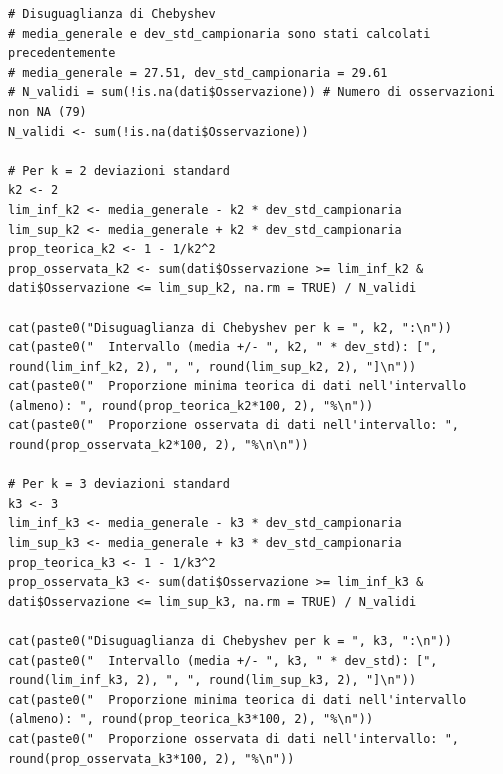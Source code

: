\documentclass[14pt, openany, titlepage]{report} %
\begin{document}
\begin{center}
\begin{lstlisting}[breaklines=true]
# Disuguaglianza di Chebyshev
# media_generale e dev_std_campionaria sono stati calcolati precedentemente
# media_generale = 27.51, dev_std_campionaria = 29.61
# N_validi = sum(!is.na(dati$Osservazione)) # Numero di osservazioni non NA (79)
N_validi <- sum(!is.na(dati$Osservazione))

# Per k = 2 deviazioni standard
k2 <- 2
lim_inf_k2 <- media_generale - k2 * dev_std_campionaria
lim_sup_k2 <- media_generale + k2 * dev_std_campionaria
prop_teorica_k2 <- 1 - 1/k2^2
prop_osservata_k2 <- sum(dati$Osservazione >= lim_inf_k2 & dati$Osservazione <= lim_sup_k2, na.rm = TRUE) / N_validi

cat(paste0("Disuguaglianza di Chebyshev per k = ", k2, ":\n"))
cat(paste0("  Intervallo (media +/- ", k2, " * dev_std): [", round(lim_inf_k2, 2), ", ", round(lim_sup_k2, 2), "]\n"))
cat(paste0("  Proporzione minima teorica di dati nell'intervallo (almeno): ", round(prop_teorica_k2*100, 2), "%\n"))
cat(paste0("  Proporzione osservata di dati nell'intervallo: ", round(prop_osservata_k2*100, 2), "%\n\n"))

# Per k = 3 deviazioni standard
k3 <- 3
lim_inf_k3 <- media_generale - k3 * dev_std_campionaria
lim_sup_k3 <- media_generale + k3 * dev_std_campionaria
prop_teorica_k3 <- 1 - 1/k3^2
prop_osservata_k3 <- sum(dati$Osservazione >= lim_inf_k3 & dati$Osservazione <= lim_sup_k3, na.rm = TRUE) / N_validi

cat(paste0("Disuguaglianza di Chebyshev per k = ", k3, ":\n"))
cat(paste0("  Intervallo (media +/- ", k3, " * dev_std): [", round(lim_inf_k3, 2), ", ", round(lim_sup_k3, 2), "]\n"))
cat(paste0("  Proporzione minima teorica di dati nell'intervallo (almeno): ", round(prop_teorica_k3*100, 2), "%\n"))
cat(paste0("  Proporzione osservata di dati nell'intervallo: ", round(prop_osservata_k3*100, 2), "%\n"))
\end{lstlisting}
\end{center}
\end{document}
